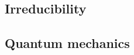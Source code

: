 \documentclass[aps,pra,10pt,twocolumn,floatfix,nofootinbib]{revtex4-1}
\numberwithin{equation}{section}
\theoremstyle{definition}
\begin{document}


\subsection{Irreducibility}

\subsection{Quantum mechanics}




\end{document}
